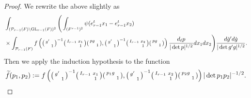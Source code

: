 \documentclass[12pt]{amsart}
\theoremstyle{remark}
\numberwithin{equation}{section}
\newcommand{\GL}{\mathrm{GL}}
\theoremstyle{definition}
\newenvironment{psmatrix}
  {\left(\begin{smallmatrix}}
  {\end{smallmatrix}\right)}
\numberwithin{equation}{subsection}
\begin{document}
\begin{proof}
We rewrite the above slightly as
\begin{align}\label{eq:beforeinduction}
\begin{split}
&\int_{(\mathcal{P}_{r-1}(F) \backslash \GL_{r-1}(F))^2} \Bigg(\int_{(F^{r-1})^2}\psi(e_{r-1}^tx_1-e_{r-1}^tx_2)\\& \times \int_{\mathcal{P}_{r-1}(F)}f\left(\begin{psmatrix} g' & \\ & 1 \end{psmatrix}^{-1}\begin{psmatrix}I_{r-1} & x_1\\ & 1 \end{psmatrix} \begin{psmatrix} pg & \\ & 1 \end{psmatrix} ,\begin{psmatrix} g' & \\ & 1 \end{psmatrix}^{-1}\begin{psmatrix}I_{r-1} & x_2\\ & 1 \end{psmatrix} \begin{psmatrix} pg & \\ & 1 \end{psmatrix}\right)\frac{d_\ell p}{|\det p|^{1/2}}dx_1dx_2\Bigg) \frac{d\dot{g}'d\dot{g}}{|\det g'g|^{1/2}}.
\end{split}
\end{align}
Then we apply the induction hypothesis to the function
\begin{align*}
    \widetilde{f}(p_1,p_2):=f\left(\begin{psmatrix} g' & \\ & 1 \end{psmatrix}^{-1}\begin{psmatrix}I_{r-1} & x_1\\ & 1 \end{psmatrix} \begin{psmatrix} p_1g & \\ & 1 \end{psmatrix} ,\begin{psmatrix} g' & \\ & 1 \end{psmatrix}^{-1}\begin{psmatrix}I_{r-1} & x_2\\ & 1 \end{psmatrix} \begin{psmatrix} p_2g & \\ & 1 \end{psmatrix}\right)|\det p_1p_2|^{-1/2}.

\end{align*}
\end{proof}
\end{document}
